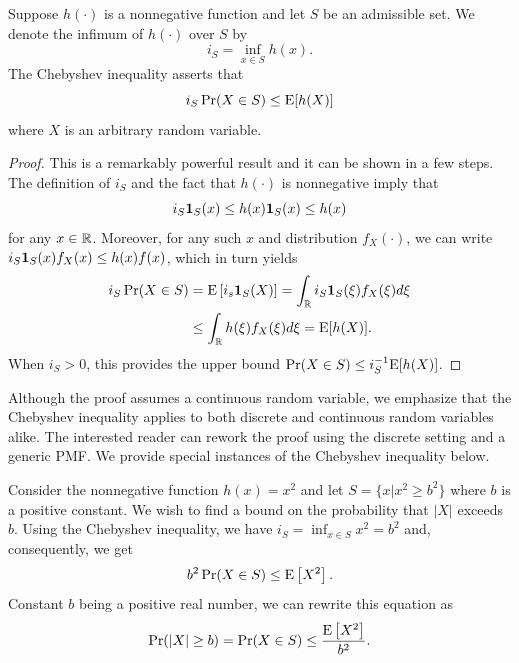 \begin{proposition}
Suppose $h (\cdot)$ is a nonnegative function and let $S$ be an admissible set.
We denote the infimum of $h (\cdot)$ over $S$ by
\begin{equation*}
i_S = \inf_{ x \in S } h (x) .
\end{equation*}
The Chebyshev inequality asserts that
\begin{equation} \label{equation:ChebyshevInequality}
i_S \Pr (X \in S)
\leq \mathrm{E} [ h(X) ]
\end{equation}
where $X$ is an arbitrary random variable.
\end{proposition}
\begin{proof}
This is a remarkably powerful result and it can be shown in a few steps.
The definition of $i_S$ and the fact that $h (\cdot)$ is nonnegative imply that
\begin{equation*}
i_S \mathbf{1}_S (x) \leq h(x) \mathbf{1}_S (x) \leq h(x)
\end{equation*}
for any $x \in \mathbb{R}$.
Moreover, for any such $x$ and distribution $f_X(\cdot)$, we can write $i_S \mathbf{1}_S (x) f_X(x) \leq h(x) f(x)$, which in turn yields
\begin{equation*}
\begin{split}
i_S \Pr (X \in S) &= \mathrm{E} \left[ i_s \mathbf{1}_S (X) \right]
= \int_{\mathbb{R}} i_S \mathbf{1}_S (\xi) f_X(\xi) d\xi \\
&\leq \int_{\mathbb{R}} h (\xi) f_X(\xi) d\xi
= \mathrm{E} [ h(X) ] .
\end{split}
\end{equation*}
When $i_S > 0$, this provides the upper bound $\Pr (X \in S) \leq i_S^{-1} \mathrm{E} [h (X)]$.
\end{proof}

Although the proof assumes a continuous random variable, we emphasize that the Chebyshev inequality applies to both discrete and continuous random variables alike.
The interested reader can rework the proof using the discrete setting and a generic PMF.
We provide special instances of the Chebyshev inequality below.

\begin{example}
Consider the nonnegative function $h(x) = x^2$ and let $S = \{ x | x^2 \geq b^2 \}$ where $b$ is a positive constant.
We wish to find a bound on the probability that $|X|$ exceeds $b$.
Using the Chebyshev inequality, we have $i_S = \inf_{x \in S} x^2 = b^2$ and, consequently, we get
\begin{equation*}
b^2 \Pr (X \in S) \leq \mathrm{E} \left[ X^2 \right] .
\end{equation*}
Constant $b$ being a positive real number, we can rewrite this equation as
\begin{equation*}
\Pr (|X| \geq b) = \Pr (X \in S) \leq \frac{\mathrm{E} \left[ X^2 \right]}{b^2} .
\end{equation*}
\end{example}

